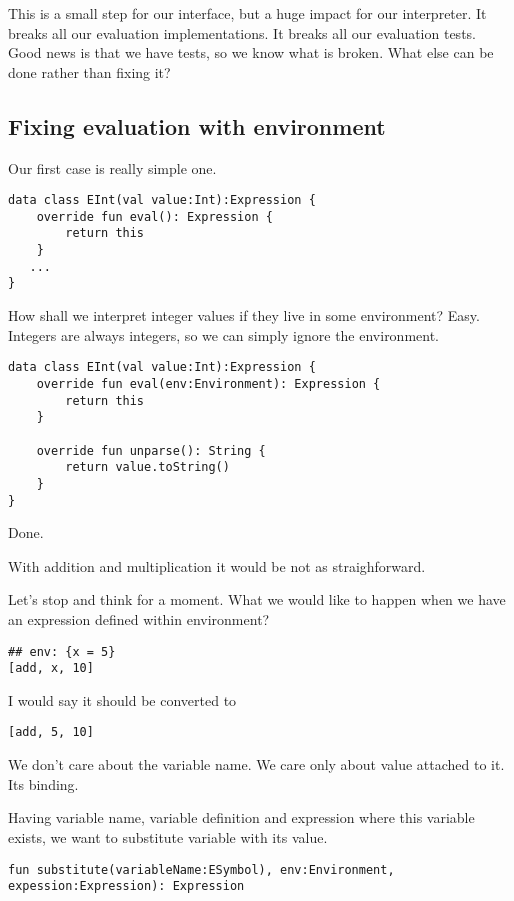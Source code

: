 \documentclass[11pt]{article}
\begin{document}
This is a small step for our interface, but a huge impact for our interpreter.
It breaks all our evaluation implementations.
It breaks all our evaluation tests.
Good news is that we have tests, so we know what is broken.
What else can be done rather than fixing it?

\subsection{Fixing evaluation with environment}
\label{sec:orgf49bd60}
Our first case is really simple one.
\begin{verbatim}
data class EInt(val value:Int):Expression {
    override fun eval(): Expression {
        return this
    }
   ...
}
\end{verbatim}

How shall we interpret integer values if they live in some environment?
Easy. Integers are always integers, so we can simply ignore the environment.

\begin{verbatim}
data class EInt(val value:Int):Expression {
    override fun eval(env:Environment): Expression {
        return this
    }

    override fun unparse(): String {
        return value.toString()
    }
}
\end{verbatim}

Done.

With addition and multiplication it would be not as straighforward.

Let's stop and think for a moment.
What we would like to happen when we have an expression defined within environment?
\begin{verbatim}
## env: {x = 5}
[add, x, 10]
\end{verbatim}

I would say it should be converted to
\begin{verbatim}
[add, 5, 10]
\end{verbatim}
We don't care about the variable name. We care only about value attached to it. Its binding.

Having variable name, variable definition and expression where this variable exists, we want to substitute variable with its value.

\begin{verbatim}
fun substitute(variableName:ESymbol), env:Environment, expession:Expression): Expression
\end{verbatim}
\end{document}
